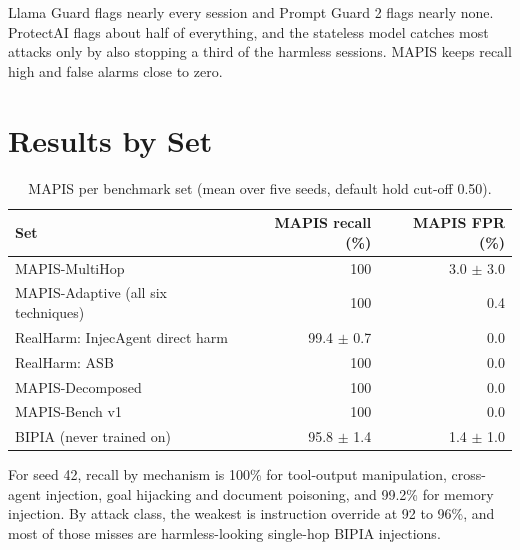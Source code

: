 Llama Guard flags nearly every session and Prompt Guard 2 flags nearly none. ProtectAI flags about half of everything, and the stateless model catches most attacks only by also stopping a third of the harmless sessions. MAPIS keeps recall high and false alarms close to zero.

\section{Results by Set}
\begin{table}[H]
\centering\small
\begin{tabular}{lrr}
\toprule
Set & MAPIS recall (\%) & MAPIS FPR (\%)\\
\midrule
MAPIS-MultiHop & 100 & 3.0 $\pm$ 3.0\\
MAPIS-Adaptive (all six techniques) & 100 & 0.4\\
RealHarm: InjecAgent direct harm & 99.4 $\pm$ 0.7 & 0.0\\
RealHarm: ASB & 100 & 0.0\\
MAPIS-Decomposed & 100 & 0.0\\
MAPIS-Bench v1 & 100 & 0.0\\
BIPIA (never trained on) & 95.8 $\pm$ 1.4 & 1.4 $\pm$ 1.0\\
\bottomrule
\end{tabular}
\caption{MAPIS per benchmark set (mean over five seeds, default hold cut-off 0.50).}
\end{table}
For seed 42, recall by mechanism is 100\% for tool-output manipulation, cross-agent injection, goal hijacking and document poisoning, and 99.2\% for memory injection. By attack class, the weakest is instruction override at 92 to 96\%, and most of those misses are harmless-looking single-hop BIPIA injections.

